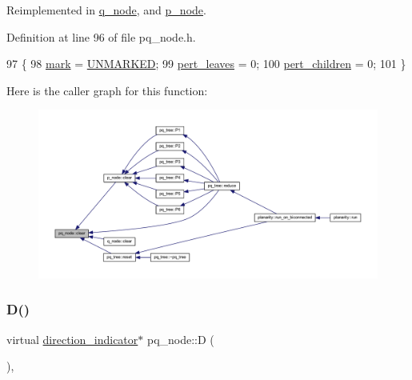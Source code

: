 Reimplemented in \mbox{\hyperlink{classq__node_a47908b6f23cab25667f20eb41ad2f09d}{q\+\_\+node}}, and \mbox{\hyperlink{classp__node_af24fe11743b0836b03c108a1bf8a0995}{p\+\_\+node}}.



Definition at line 96 of file pq\+\_\+node.\+h.


\begin{DoxyCode}
97     \{
98     \mbox{\hyperlink{classpq__node_aee913582a7b268ce2570bee8a8367c50}{mark}} = \mbox{\hyperlink{classpq__node_a6236b20cd5f6cc02cb5f637ed34c96d9a7fbe5f6a363f9f2b5a154c61b2389d59}{UNMARKED}};
99     \mbox{\hyperlink{classpq__node_a3fb78609f93f41efd6826ed3169fc312}{pert\_leaves}} = 0;
100     \mbox{\hyperlink{classpq__node_a8d8fb7b3059e7aeecf62eeed34076afb}{pert\_children}} = 0;
101     \}
\end{DoxyCode}
Here is the caller graph for this function\+:
\nopagebreak
\begin{figure}[H]
\begin{center}
\leavevmode
\includegraphics[width=350pt]{classpq__node_a13100e0b030cc047f382d9ddf6a44f4a_icgraph}
\end{center}
\end{figure}
\mbox{\label{classpq__node_a5c85bd25c32bb6f18d6d8d1bfd35f260}} 
\subsubsection{\texorpdfstring{D()}{D()}}
{\footnotesize\ttfamily virtual \mbox{\hyperlink{classdirection__indicator}{direction\+\_\+indicator}}$\ast$ pq\+\_\+node\+::D (\begin{DoxyParamCaption}{ }\end{DoxyParamCaption})\hspace{0.3cm}{\ttfamily [protected]}, {}}




